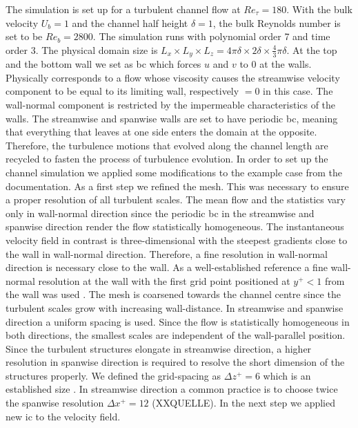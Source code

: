 The simulation is set up for a turbulent channel flow at $Re_\tau = 180$.
With the bulk velocity $U_b = 1$ and the channel half height $\delta = 1$, the bulk Reynolds number is set to be $Re_b = 2800$.
The simulation runs with polynomial order 7 and time order 3.
The physical domain size is $ L_x \times L_y \times L_z = 4\pi \delta \times 2 \delta \times \frac{4}{3}\pi \delta$.
At the top and the bottom wall we set  as \acrshort{bc} which forces $u$ and $v$ to 0 at the walls.
Physically corresponds to a flow whose viscosity causes the streamwise velocity component to be equal to its limiting wall, respectively $=0$ in this case. 
The wall-normal component is restricted by the impermeable characteristics of the walls.
The streamwise and spanwise walls are set to have periodic \acrshort{bc}, meaning that everything that leaves at one side enters the domain at the opposite.
Therefore, the turbulence motions that evolved along the channel length are recycled to fasten the process of turbulence evolution.
In order to set up the channel simulation we applied some modifications to the example case from the  documentation.
As a first step we refined the mesh.
This was necessary to ensure a proper resolution of all turbulent scales.
The mean flow and the statistics vary only in wall-normal direction since the periodic \acrshort{bc} in the streamwise and spanwise direction render the flow statistically homogeneous.
The instantaneous velocity field in contrast is three-dimensional with the steepest gradients close to the wall in wall-normal direction.
Therefore, a fine resolution in wall-normal direction is necessary close to the wall.
As a well-established reference a fine wall-normal resolution at the wall with the first grid point positioned at $ y^+< 1$ from the wall was used \citep{schlatter_assessment_2010}.
The mesh is coarsened towards the channel centre since the turbulent scales grow with increasing wall-distance.
In streamwise and spanwise direction a uniform spacing is used. 
Since the flow is statistically homogeneous in both directions, the smallest scales are independent of the wall-parallel position.
Since the turbulent structures elongate in streamwise direction, a higher resolution in spanwise direction is required to resolve the short dimension of the structures properly.
We defined the grid-spacing as $\Delta z^+= 6$ which is an established size \citep{pope_turbulent_2015}.
In streamwise direction a common practice is to choose twice the spanwise resolution $\Delta x^+= 12$ (XXQUELLE). 
In the next step we applied new \acrshort{ic} to the velocity field.
